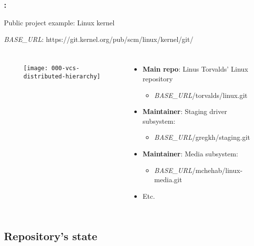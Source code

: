 \begin{frame}
    \frametitle{\secname: \small\subsecname\normalsize}

    Public project example: Linux kernel

    \textit{BASE\_URL}: \small https://git.kernel.org/pub/scm/linux/kernel/git/ \normalsize

    \begin{columns}
        \begin{figure}[h]
            \texttt{[image: 000-vcs-distributed-hierarchy]}
            \centering
        \end{figure}

        \begin{itemize}
            \item \textbf{Main repo}: Linus Torvalds' Linux repository
            \begin{itemize}
                \item \small \textit{BASE\_URL}/torvalds/linux.git \normalsize
            \end{itemize}
            \item \textbf{Maintainer}: Staging driver subsystem:
            \begin{itemize}
                \item \small \textit{BASE\_URL}/gregkh/staging.git \normalsize
            \end{itemize}
            \item \textbf{Maintainer}: Media subsystem:
            \begin{itemize}
                \item \small \textit{BASE\_URL}/mchehab/linux-media.git \normalsize
            \end{itemize}
            \item Etc.
        \end{itemize}
    \end{columns}
\end{frame}

\subsection{Repository's state}

